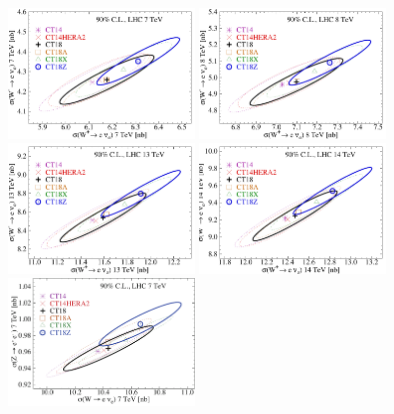 \begin{widetext}
\begin{figure}[p]
	\begin{center}
  \includegraphics[width=0.44\textwidth]{./fig/sec6/cor_tel_ct18s_Wp-Wm__7TeV_shifted.pdf} 
  \includegraphics[width=0.44\textwidth]{./fig/sec6/cor_tel_ct18s_Wp-Wm__8TeV_shifted.pdf} \\
  \includegraphics[width=0.44\textwidth]{./fig/sec6/cor_tel_ct18s_Wp-Wm_13TeV_shifted.pdf} 
  \includegraphics[width=0.44\textwidth]{./fig/sec6/cor_tel_ct18s_Wp-Wm_14TeV_shifted.pdf} \\
  \includegraphics[width=0.44\textwidth]{./fig/sec6/cor_tel_ct18s_W-Z__7TeV_shifted_KP_ect.pdf} 

\end{center}
\end{figure}
\end{widetext}

